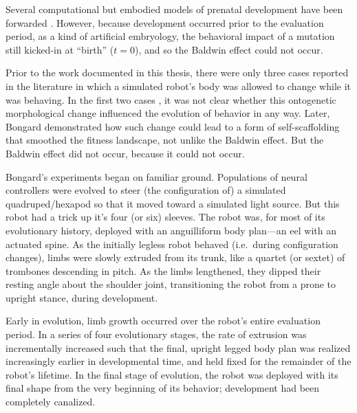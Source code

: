 Several computational but embodied models of prenatal development have been forwarded
\cite{dellaert1994toward,dellaert1996developmental,Eggenberger97,Bongard01,miller2004evolving,basanta2008evolution,doursat2009organically,doursat2014growing,joachimczak2016artificial}.
However, because development occurred prior to the evaluation period,
as a kind of artificial embryology,
the behavioral impact of a mutation 
still kicked-in at ``birth'' ($t=0$), and so the Baldwin effect could not occur.


Prior to the work documented in this thesis, there were only three cases reported in the literature in which a simulated robot's body was allowed to change while it was behaving. 
In the first two cases \cite{ventrella1998designing,komosinski2003framsticks}, it was not clear whether this ontogenetic morphological change influenced the evolution of behavior in any way. 
Later, Bongard \cite{bongard2011morphological} demonstrated how such change could lead to a form of self-scaffolding that smoothed the fitness landscape,
not unlike the Baldwin effect.
But the Baldwin effect did not occur, because it could not occur.

Bongard's experiments began on familiar ground.
Populations of neural controllers were evolved to
steer (the configuration of) a simulated quadruped/hexapod so that it moved toward a simulated light source.
But this robot had a trick up it's four (or six) sleeves.
The robot was, for most of its evolutionary history, deployed with an anguilliform body plan---an eel with an actuated spine.
As the initially legless robot behaved (i.e.~during configuration changes),
limbs were slowly extruded from its trunk,
like a quartet (or sextet) of trombones descending in pitch.
As the limbs lengthened, they dipped their resting angle about the shoulder joint, transitioning the robot from a prone to upright stance, during development.

Early in evolution, limb growth occurred over the robot's entire evaluation period.
In a series of four evolutionary stages,
the rate of extrusion was incrementally increased
such that the final, upright legged body plan was realized increasingly earlier in developmental time, and held fixed for the remainder of the robot's lifetime.
In the final stage of evolution,
the robot was deployed with its final shape from the very beginning of its behavior; development had been completely canalized.

